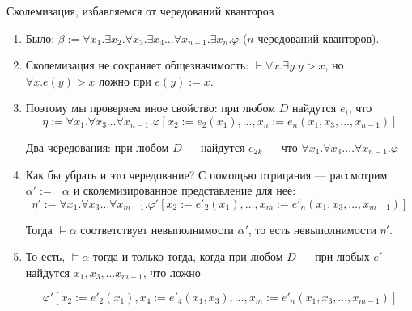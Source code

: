 \documentclass[aspectratio=169]{beamer}
\begin{document}
\begin{frame}{Сколемизация, избавляемся от чередований кванторов}
\begin{enumerate}
\item Было: $\beta := \forall x_1.\exists x_2.\forall x_3.\exists x_4\dots \forall x_{n-1}.\exists x_n.\varphi$
($n$ чередований кванторов).
\item Сколемизация не сохраняет общезначимость: $\vdash\forall x.\exists y.y > x$, но
$\forall x.e(y) > x$ ложно при $e(y) := x$.
\item Поэтому мы проверяем иное свойство: при любом $D$ найдутся $e_i$, что 
$$\eta := \forall x_1.\forall x_3\dots\forall x_{n-1}.\varphi[x_2:=e_2(x_1), \dots, x_n := e_n(x_1,x_3,\dots,x_{n-1})]$$

Два чередования: при любом $D$ --- найдутся $e_{2k}$ --- что $\forall x_1.\forall x_3.\dots\forall x_{n-1}.\varphi$
\item Как бы убрать и это чередование? С помощью отрицания --- рассмотрим $\alpha' := \neg\alpha$ и
сколемизированное представление для неё:
$$\eta' := \forall x_1.\forall x_3\dots\forall x_{m-1}.\varphi'[x_2:=e'_2(x_1), \dots, x_m := e'_n(x_1,x_3,\dots,x_{m-1})]$$

Тогда $\models\alpha$ соответствует невыполнимости $\alpha'$, то есть невыполнимости $\eta'$.
\item То есть, $\models \alpha$ тогда и только тогда, когда
при любом $D$ --- при любых $e'$ --- найдутся $x_1, x_3, \dots x_{m-1}$, что ложно

$$\varphi'[x_2:=e'_2(x_1), x_4:=e'_4(x_1,x_3), \dots, x_m := e'_n(x_1,x_3,\dots,x_{m-1})]$$
\end{enumerate}
\end{frame}
\end{document}
